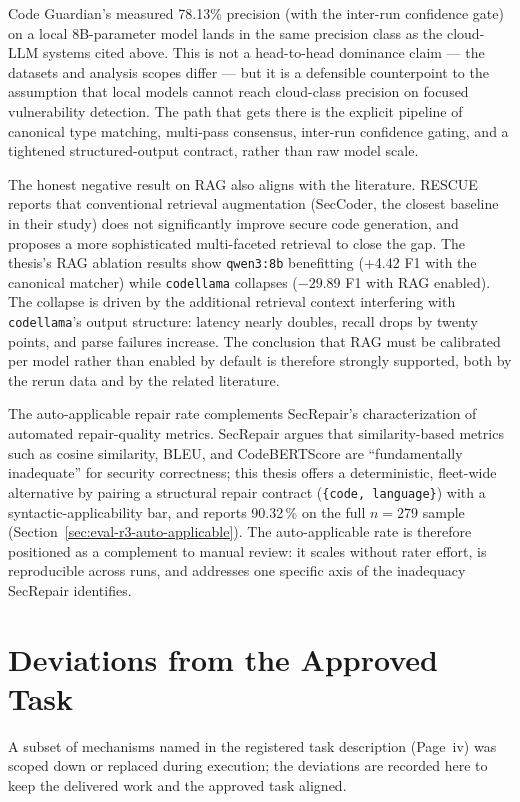 Code Guardian's measured 78.13\% precision (with the inter-run confidence gate) on a local 8B-parameter model lands in the same precision class as the cloud-LLM systems cited above. This is not a head-to-head dominance claim --- the datasets and analysis scopes differ --- but it is a defensible counterpoint to the assumption that local models cannot reach cloud-class precision on focused vulnerability detection. The path that gets there is the explicit pipeline of canonical type matching, multi-pass consensus, inter-run confidence gating, and a tightened structured-output contract, rather than raw model scale.

The honest negative result on RAG also aligns with the literature. RESCUE~\cite{shi2025rescue} reports that conventional retrieval augmentation (SecCoder, the closest baseline in their study) does not significantly improve secure code generation, and proposes a more sophisticated multi-faceted retrieval to close the gap. The thesis's RAG ablation results show \texttt{qwen3:8b} benefitting (+4.42 F1 with the canonical matcher) while \texttt{codellama} collapses ($-29.89$ F1 with RAG enabled). The collapse is driven by the additional retrieval context interfering with \texttt{codellama}'s output structure: latency nearly doubles, recall drops by twenty points, and parse failures increase. The conclusion that RAG must be calibrated per model rather than enabled by default is therefore strongly supported, both by the rerun data and by the related literature.

The auto-applicable repair rate complements SecRepair's characterization of automated repair-quality metrics. SecRepair argues that similarity-based metrics such as cosine similarity, BLEU, and CodeBERTScore are ``fundamentally inadequate'' for security correctness; this thesis offers a deterministic, fleet-wide alternative by pairing a structural repair contract (\texttt{\{code, language\}}) with a syntactic-applicability bar, and reports 90.32\,\% on the full $n=279$ sample (Section~\ref{sec:eval-r3-auto-applicable}). The auto-applicable rate is therefore positioned as a complement to manual review: it scales without rater effort, is reproducible across runs, and addresses one specific axis of the inadequacy SecRepair identifies.

\section{Deviations from the Approved Task}

A subset of mechanisms named in the registered task description (Page~iv) was scoped down or replaced during execution; the deviations are recorded here to keep the delivered work and the approved task aligned.

